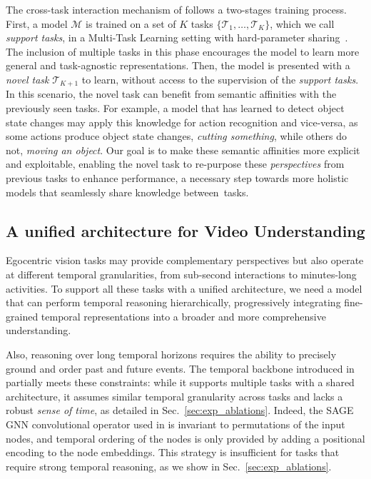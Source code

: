 %
The cross-task interaction mechanism of \ours follows a two-stages training process.
First, a model $\mathcal{M}$ is trained on a set of $K$ tasks $\{\mathcal{T}_1,\dots,\mathcal{T}_K\}$, which we call \emph{support tasks}, in a Multi-Task Learning setting with hard-parameter sharing~\cite{ruder2017overview}.
The inclusion of multiple tasks in this phase encourages the model to learn more general and task-agnostic representations.
%
Then, the model is presented with a \emph{novel task} $\mathcal{T}_{K+1}$ to learn, without access to the supervision of the \emph{support tasks}.
In this scenario, the novel task can benefit from semantic affinities with the previously seen tasks.
For example, a model that has learned to detect object state changes may apply this knowledge for action recognition and vice-versa, as some actions produce object state changes, \eg \emph{cutting something}, while others do not, \eg \emph{moving an object}.
Our goal is to make these semantic affinities more explicit and exploitable, enabling the novel task to re-purpose these \emph{perspectives} from previous tasks to enhance performance,
a necessary step towards more holistic models that seamlessly share knowledge between~tasks.



\subsection{A unified architecture for Video Understanding}\label{sec:method_arch}
Egocentric vision tasks may provide complementary perspectives but also operate at different temporal granularities, from sub-second interactions to minutes-long activities.
To support all these tasks with a unified architecture, we need a model that can perform temporal reasoning hierarchically, progressively integrating fine-grained temporal representations into a broader and more comprehensive understanding.


Also, reasoning over long temporal horizons requires the ability to precisely ground and order past and future events.
The temporal backbone introduced in \ourscvpr~\cite{egopack} partially meets these constraints: while it supports multiple tasks with a shared architecture, it assumes similar temporal granularity across tasks and lacks a robust \emph{sense of time}, as detailed in Sec.~\ref{sec:exp_ablations}.
%
Indeed, the SAGE GNN convolutional operator used in \ourscvpr is invariant to permutations of the input nodes, and temporal ordering of the nodes is only provided by adding a positional encoding to the node embeddings.
This strategy is insufficient for tasks that require strong temporal reasoning, as we show in Sec.~\ref{sec:exp_ablations}.



